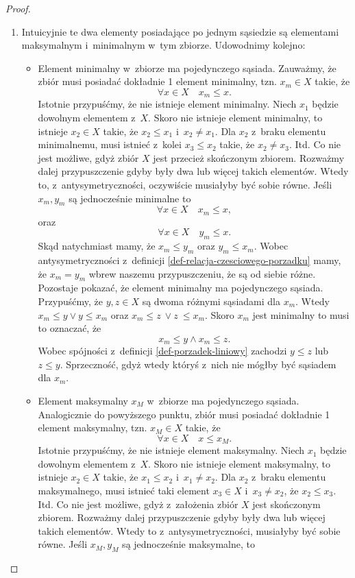 \documentclass[12pt,a4paper]{report}
\begin{document}
\begin{proof}
\begin{enumerate}
\item Intuicyjnie te dwa elementy posiadające po jednym sąsiedzie są elementami maksymalnym i~minimalnym w~tym zbiorze. Udowodnimy kolejno:
\begin{itemize}
\item Element minimalny w~zbiorze ma pojedynczego sąsiada. Zauważmy, że zbiór musi posiadać dokładnie 1 element minimalny, tzn. $x_m \in X$ takie, że 
$$
\forall x \in X \quad x_m \leq x.
$$
Istotnie przypuśćmy, że nie istnieje element minimalny. Niech $x_1$ będzie dowolnym elementem z~$X$. Skoro nie istnieje element minimalny, to istnieje $x_2 \in X$ takie, że $x_2 \leq x_1$ i~$x_2 \neq x_1$. Dla $x_2$ z~braku elementu minimalnemu, musi istnieć z~kolei $x_3 \leq x_2$ takie, że $x_2 \neq x_3$. Itd. Co nie jest możliwe, gdyż zbiór $X$ jest przecież skończonym zbiorem.
Rozważmy dalej przypuszczenie gdyby były dwa lub więcej takich elementów. Wtedy to, z~antysymetryczności, oczywiście musiałyby być sobie równe. Jeśli $x_m, y_m$ są jednocześnie minimalne to
$$
\forall x \in X \quad x_m \leq x,
$$
oraz 
$$
\forall x \in X \quad y_m \leq x.
$$
Skąd natychmiast mamy, że $ x_m \leq y_m$ oraz $y_m \leq x_m$. Wobec antysymetryczności z~definicji \ref{def-relacja-czesciowego-porzadku} mamy, że $x_m = y_m$ wbrew naszemu przypuszczeniu, że są od siebie różne.
Pozostaje pokazać, że element minimalny ma pojedynczego sąsiada. Przypuśćmy, że $y,z \in X$ są dwoma różnymi sąsiadami dla $x_m$. Wtedy $ x_m \leq y \lor y \leq x_m$ oraz $ x_m \leq z~\lor z~\leq x_m$. Skoro $x_m$ jest minimalny to musi to oznaczać, że
$$
x_m \leq y \land x_m \leq z.
$$ 
Wobec spójności z~definicji \ref{def-porzadek-liniowy} zachodzi $y \leq z$ lub $z \leq y$. Sprzeczność, gdyż wtedy któryś z~nich nie mógłby być sąsiadem dla $x_m$.
\item Element maksymalny $x_M$ w~zbiorze ma pojedynczego sąsiada. Analogicznie do powyższego punktu, zbiór musi posiadać dokładnie 1 element maksymalny, tzn. $x_M \in X$ takie, że
$$\forall x \in X \quad x \leq x_M.$$
Istotnie przypuśćmy, że nie istnieje element maksymalny. Niech $x_1$ będzie dowolnym elementem z~$X$. Skoro nie istnieje element maksymalny, to istnieje $x_2 \in X$ takie, że $x_1 \leq x_2$ i~$x_1 \neq x_2$. Dla $x_2$ z~braku elementu maksymalnego, musi istnieć taki element $x_3 \in X$ i~$x_3 \neq x_2$, że $x_2 \leq x_3$. Itd. Co nie jest możliwe, gdyż z~założenia zbiór $X$ jest skończonym zbiorem.
Rozważmy dalej przypuszczenie gdyby były dwa lub więcej takich elementów. Wtedy to z~antysymetryczności, musiałyby być sobie równe. Jeśli $x_M, y_M$ są jednocześnie maksymalne, to 

\end{itemize}
\end{enumerate}
\end{proof}
\end{document}
